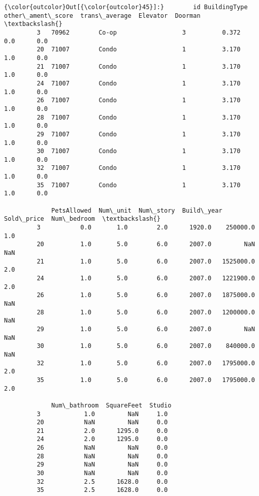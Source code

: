 \documentclass[11pt]{article}
\begin{document}
\begin{Verbatim}[commandchars=\\\{\}]
{\color{outcolor}Out[{\color{outcolor}45}]:}        id BuildingType  other\_ament\_score  trans\_average  Elevator  Doorman  \textbackslash{}
         3   70962        Co-op                  3          0.372       0.0      0.0   
         20  71007        Condo                  1          3.170       1.0      0.0   
         21  71007        Condo                  1          3.170       1.0      0.0   
         24  71007        Condo                  1          3.170       1.0      0.0   
         26  71007        Condo                  1          3.170       1.0      0.0   
         28  71007        Condo                  1          3.170       1.0      0.0   
         29  71007        Condo                  1          3.170       1.0      0.0   
         30  71007        Condo                  1          3.170       1.0      0.0   
         32  71007        Condo                  1          3.170       1.0      0.0   
         35  71007        Condo                  1          3.170       1.0      0.0   
         
             PetsAllowed  Num\_unit  Num\_story  Build\_year  Sold\_price  Num\_bedroom  \textbackslash{}
         3           0.0       1.0        2.0      1920.0    250000.0          1.0   
         20          1.0       5.0        6.0      2007.0         NaN          NaN   
         21          1.0       5.0        6.0      2007.0   1525000.0          2.0   
         24          1.0       5.0        6.0      2007.0   1221900.0          2.0   
         26          1.0       5.0        6.0      2007.0   1875000.0          NaN   
         28          1.0       5.0        6.0      2007.0   1200000.0          NaN   
         29          1.0       5.0        6.0      2007.0         NaN          NaN   
         30          1.0       5.0        6.0      2007.0    840000.0          NaN   
         32          1.0       5.0        6.0      2007.0   1795000.0          2.0   
         35          1.0       5.0        6.0      2007.0   1795000.0          2.0   
         
             Num\_bathroom  SquareFeet  Studio  
         3            1.0         NaN     1.0  
         20           NaN         NaN     0.0  
         21           2.0      1295.0     0.0  
         24           2.0      1295.0     0.0  
         26           NaN         NaN     0.0  
         28           NaN         NaN     0.0  
         29           NaN         NaN     0.0  
         30           NaN         NaN     0.0  
         32           2.5      1628.0     0.0  
         35           2.5      1628.0     0.0  
\end{Verbatim}
            
\end{document}
